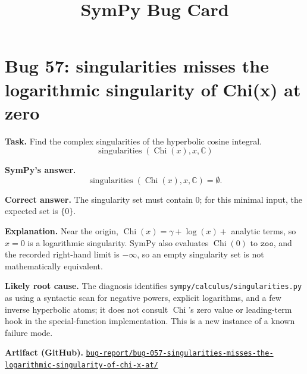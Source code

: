 \documentclass[11pt]{article}
\title{SymPy Bug Card}
\author{}
\date{}
\newcommand{\artifactrepo}{https://github.com/TODO-org/TODO-repo}
\newcommand{\bugbundle}[1]{\href{\artifactrepo/tree/main/bug-report/#1}{\nolinkurl{bug-report/#1/}}}
\begin{document}
\maketitle

\section*{Bug 57: singularities misses the logarithmic singularity of Chi(x) at zero}

\begin{counterexamplebox}
\textbf{Task.} Find the complex singularities of the hyperbolic cosine integral.
\[
\operatorname{singularities}(\operatorname{Chi}(x),x,\mathbb{C})
\]

\medskip
\textbf{SymPy's answer.}
\[
\operatorname{singularities}(\operatorname{Chi}(x),x,\mathbb{C})=\emptyset .
\]

\medskip
\textbf{Correct answer.} The singularity set must contain \(0\); for this
minimal input, the expected set is \(\{0\}\).

\medskip
\textbf{Explanation.} Near the origin,
\(\operatorname{Chi}(x)=\gamma+\log(x)+\) analytic terms, so \(x=0\) is a
logarithmic singularity. SymPy also evaluates \(\operatorname{Chi}(0)\) to
\(\texttt{zoo}\), and the recorded right-hand limit is \(-\infty\), so an empty
singularity set is not mathematically equivalent.

\medskip
\textbf{Likely root cause.} The diagnosis identifies
\nolinkurl{sympy/calculus/singularities.py} as using a syntactic scan for
negative powers, explicit logarithms, and a few inverse hyperbolic atoms; it
does not consult \(\operatorname{Chi}\)'s zero value or leading-term hook in the
special-function implementation. This is a new instance of a known failure mode.

\medskip
\textbf{Artifact (GitHub).} \bugbundle{bug-057-singularities-misses-the-logarithmic-singularity-of-chi-x-at}
\end{counterexamplebox}
\end{document}
